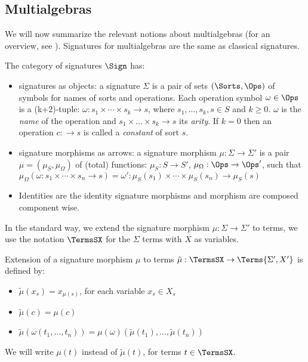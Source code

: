 \subsection{Multialgebras}
We will now summarize the relevant notions about multialgebras (for an
overview, see \cite{multi,catrel}). %
Signatures for multialgebras are the same as classical signatures.
%
\begin{definition}\label{de:Sign}
The category of signatures $\Sign$ has:
\begin{itemize}\MyLPar
\item signatures as objects: a signature
$\Sigma$ is a pair of sets $(\Sorts,\Ops)$ of symbols for names of sorts and
operations. Each operation symbol $\omega\in\Ops$ is a (k+2)-tuple:
$\omega : s_1 \times \cdots \times s_k \to s$,
where {$s_1, \ldots , s_k,s \in S$ and $k \geq 0$}.  $\omega$ is the
{\it name} of the operation and $s_1 \times \ldots \times s_k \to s$ its {\it
arity}. If $ k=0$ then an operation $c: \to s$ is called a {\it constant} of
sort $s$.
\item  signature morphisms as arrows: 
a signature morphism $\mu: \Sigma \to \Sigma'$ is a pair $\mu = (\mu_S,
\mu_{\Omega})$ of (total) functions:
$\mu_S: S \to S'$, $\mu_{\Omega}: \Ops \to \Ops'$, 
such that 
$ \mu_{\Omega}(\omega:s_1 \times \cdots \times s_n \to s) =
\omega':\mu_S(s_1) \times \cdots \times \mu_S(s_n) \to \mu_S(s)$
\item
Identities are the identity
signature morphisms and morphism are composed component wise.
\end{itemize}
\end{definition}
%
In the standard way, 
we extend the signature morphism $\mu : \Sigma \to \Sigma'$ to terms, we use the notation $\TermsSX$ for the $\Sigma$ terms with $X$ as variables.

\begin{definition} Extension of a
signature morphism $\mu$ to terms ${\tilde{\mu}} : \TermsSX \to \Terms{\Sigma',X'}$ is defined by:
\begin{itemize}\MyLPar
\item ${\tilde{\mu}} (x_s) = x_{\mu (s)}$, for each variable $x_s \in X_s$
\item ${\tilde{\mu}} (c) = \mu(c)$
\item ${\tilde{\mu}} (\omega(t_1, \ldots ,t_n )) = \mu(\omega)({\tilde{\mu}}(t_1), \ldots , {\tilde{\mu}}(t_n))$
\end{itemize}
\end{definition}
We will write $\mu(t)$
instead of ${\tilde{\mu}}(t)$, for terms $t \in \TermsSX$.

